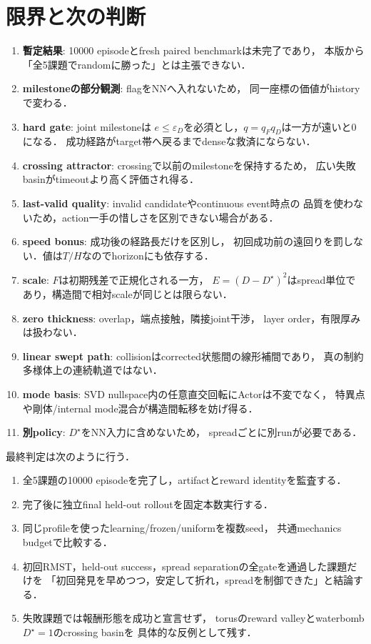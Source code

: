 \documentclass[a4paper,11pt]{ltjsarticle}
\begin{document}
\section{限界と次の判断}
\label{sec:limitations}

\begin{enumerate}
 \item \textbf{暫定結果}: 10000 episodeとfresh paired benchmarkは未完了であり，
 本版から「全5課題でrandomに勝った」とは主張できない．
 \item \textbf{milestoneの部分観測}: flagをNNへ入れないため，
 同一座標の価値がhistoryで変わる．
 \item \textbf{hard gate}: joint milestoneは
 $e\le\varepsilon_D$を必須とし，$q=q_Fq_D$は一方が遠いと0になる．
 成功経路がtarget帯へ戻るまでdenseな救済にならない．
 \item \textbf{crossing attractor}: crossingで以前のmilestoneを保持するため，
 広い失敗basinがtimeoutより高く評価され得る．
 \item \textbf{last-valid quality}: invalid candidateやcontinuous event時点の
 品質を使わないため，action一手の惜しさを区別できない場合がある．
 \item \textbf{speed bonus}: 成功後の経路長だけを区別し，
 初回成功前の遠回りを罰しない．値は$T/H$なのでhorizonにも依存する．
 \item \textbf{scale}: $F$は初期残差で正規化される一方，
 $E=(D-D^\star)^2$はspread単位であり，構造間で相対scaleが同じとは限らない．
 \item \textbf{zero thickness}: overlap，端点接触，隣接joint干渉，
 layer order，有限厚みは扱わない．
 \item \textbf{linear swept path}: collisionはcorrected状態間の線形補間であり，
 真の制約多様体上の連続軌道ではない．
 \item \textbf{mode basis}: SVD nullspace内の任意直交回転にActorは不変でなく，
 特異点や剛体/internal mode混合が構造間転移を妨げ得る．
 \item \textbf{別policy}: $D^\star$をNN入力に含めないため，
 spreadごとに別runが必要である．
\end{enumerate}

最終判定は次のように行う．
\begin{enumerate}
 \item 全5課題の10000 episodeを完了し，artifactとreward identityを監査する．
 \item 完了後に独立final held-out rolloutを固定本数実行する．
 \item 同じprofileを使ったlearning/frozen/uniformを複数seed，
 共通mechanics budgetで比較する．
 \item 初回RMST，held-out success，spread separationの全gateを通過した課題だけを
 「初回発見を早めつつ，安定して折れ，spreadを制御できた」と結論する．
 \item 失敗課題では報酬形態を成功と宣言せず，
 torusのreward valleyとwaterbomb $D^\star=1$のcrossing basinを
 具体的な反例として残す．
\end{enumerate}
\end{document}
